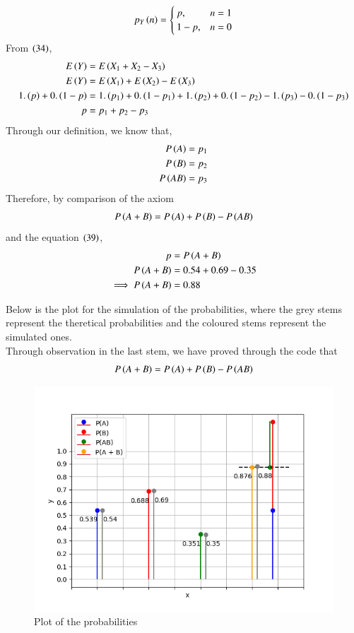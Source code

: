 \documentclass[journal]{IEEEtran}
\begin{document}
\begin{align}
	p_{Y}\left(n\right) =
	\begin{cases}
		p ,& n = 1\\
		1 - p ,& n = 0
	\end{cases}
\end{align}
From $\left(34\right)$,
\begin{align}
	E\left(Y\right) &= E\left(X_1 + X_2 - X_3\right)\\
	E\left(Y\right) &= E\left(X_1\right) + E\left(X_2\right) - E\left(X_3\right)\\
	1.\left(p\right) + 0.\left(1 - p\right) &= 1.\left(p_1\right) + 0.\left(1 - p_1\right) + 1.\left(p_2\right) + 0.\left(1 - p_2\right) - 1.\left(p_3\right) - 0.\left(1 - p_3\right)\\
	p &= p_1 + p_2 - p_3
\end{align}
Through our definition, we know that,
\begin{align}
	P\left(A\right) = p_1\\
	P\left(B\right) = p_2\\
	P\left(AB\right) = p_3
\end{align}
Therefore, by comparison of the axiom
\begin{align}
	P\left(A + B\right) = P\left(A\right) + P\left(B\right) - P\left(AB\right)
\end{align}
and the equation $\left(39\right)$,
\begin{align}
	p &= P\left(A + B\right)\\
	P\left(A + B\right) &= 0.54 + 0.69 - 0.35\\
	\implies P\left(A + B\right) &= 0.88
\end{align}

\pagebreak
Below is the plot for the simulation of the probabilities, where the grey stems represent the theretical probabilities and the coloured stems represent the simulated ones.\\
Through observation in the last stem, we have proved through the code that
\begin{align}
	P\left(A + B\right) = P\left(A\right) + P\left(B\right) - P\left(AB\right)
\end{align}

\begin{figure}[h!]
	\centering
	\includegraphics[width=1\columnwidth]{figs/simulated.png}
	\caption{Plot of the probabilities}
	\label{stemplot}
\end{figure}
\end{document}
